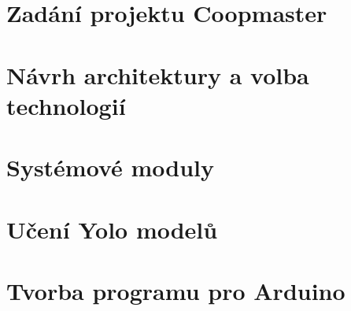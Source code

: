 
\setlength{\parindent}{0pt}
\newpage
\chapter{Zadání projektu Coopmaster}\label{ch:tvorba-zadani}
\newcommand{\textcolorname}{black}
\textcolor{\textcolorname}{}

\newpage
\chapter{Návrh architektury a volba technologií}\label{ch:navrh-architektury-a-volba-technologii}
\textcolor{\textcolorname}{}

\newpage
\chapter{Systémové moduly}\label{ch:popis-jednotlivych-modulu}
\textcolor{\textcolorname}{}
\clearpage
\textcolor{\textcolorname}{}
\clearpage
\textcolor{\textcolorname}{}
\clearpage
\textcolor{\textcolorname}{}
\clearpage
\textcolor{\textcolorname}{}
\clearpage
\textcolor{\textcolorname}{}
\clearpage
\textcolor{\textcolorname}{}
\clearpage
\textcolor{\textcolorname}{}
\clearpage
\textcolor{\textcolorname}{}
\clearpage
\textcolor{\textcolorname}{}
\clearpage
\textcolor{\textcolorname}{}
\clearpage
\textcolor{\textcolorname}{}
\clearpage
\textcolor{\textcolorname}{}

\clearpage
\chapter{Učení Yolo modelů}\label{ch:uceni_yolo_modelu}
\textcolor{\textcolorname}{}
\newpage
\textcolor{\textcolorname}{}

\newpage
\chapter{Tvorba programu pro Arduino}\label{ch:tvorba-programu-pro-arduino}
\textcolor{\textcolorname}{}

